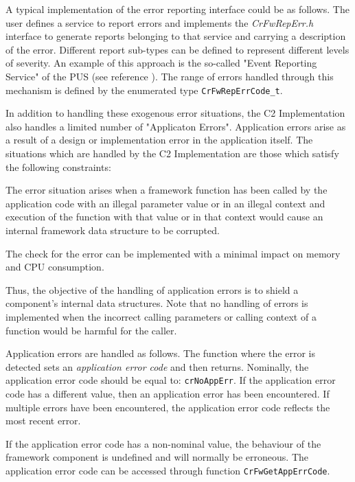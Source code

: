 \documentclass[a4paper,10pt]{article}
\newenvironment{fw_itemize}						%
{\begin{itemize}
  \setlength{\itemsep}{1mm}
  \setlength{\parskip}{0pt}
  \setlength{\parsep}{0pt}}
{\end{itemize}}
\begin{document}
A typical implementation of the error reporting interface could be as follows. The user defines a service to report errors and implements the \textit{CrFwRepErr.h} interface to generate reports belonging to that service and carrying a description of the error. Different report sub-types can be defined to represent different levels of severity. An example of this approach is the so-called "Event Reporting Service" of the PUS (see reference \cite{ref:pus}). The range of errors handled through this mechanism is defined by the enumerated type \texttt{CrFwRepErrCode\_t}.

In addition to handling these exogenous error situations, the C2 Implementation also handles a limited number of "Applicaton Errors". Application errors arise as a result of a design or implementation error in the application itself. The situations which are handled by the C2 Implementation are those which satisfy the following constraints:

\begin{fw_itemize}
\item The error situation arises when a framework function has been called by the application code with an illegal parameter value or in an illegal context and execution of the function with that value or in that context would cause an internal framework data structure to be corrupted.
\item The check for the error can be implemented with a minimal impact on memory and CPU consumption.
\end{fw_itemize}

Thus, the objective of the handling of application errors is to shield a component's internal data structures. Note that no handling of errors is implemented when the incorrect calling parameters or calling context of a function would be harmful for the caller. 

Application errors are handled as follows. The function where the error is detected sets an \textit{application error code} and then returns. Nominally, the application error code should be equal to: \texttt{crNoAppErr}. If the application error code has a different value, then an application error has been encountered. If multiple errors have been encountered, the application error code reflects the most recent error.

If the application error code has a non-nominal value, the behaviour of the framework component is undefined and will normally be erroneous. The application error code can be accessed through function \texttt{CrFwGetAppErrCode}. 
\end{document}
